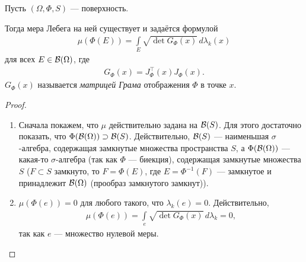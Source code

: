 \begin{thm}
 Пусть $(\Omega, \Phi, S)$  --- поверхность.

 Тогда мера Лебега на ней существует и задаётся формулой
 \begin{align*}
  \mu(\Phi(E)) = \int\limits_{E} \sqrt{ \det G_{\Phi}(x) } \, d\lambda_k(x)
 \end{align*} для всех $E \in \mathcal{B}(\Omega)$, где
 \begin{align}
  \label{equation:lebesgue_measure_on_surface_formula}
  G_{\Phi}(x) = J_{\Phi}^{\top}(x) J_{\Phi}(x)
 .\end{align}  $G_{\Phi}(x)$ называется \textit{матрицей Грама} отображения $\Phi$ в точке $x$.
\end{thm}
\begin{proof}\
 \begin{enumerate}
 \item Сначала покажем, что $\mu$ действительно задана на $\mathcal{B}(S)$. Для этого достаточно показать, что $\Phi(\mathcal{B}(\Omega)) \supset \mathcal{B}(S)$. Действительно, $\mathcal{B}(S)$ --- наименьшая $\sigma$-алгебра, содержащая замкнутые множества пространства $S$, а $\Phi(\mathcal{B}(\Omega))$ --- какая-то $\sigma$-алгебра (так как $\Phi$ --- биекция), содержащая замкнутые множества $S$ ($F \subset S$ замкнуто, то $F = \Phi(E)$, где $E = \Phi^{-1}(F)$ --- замкнутое и принадлежит $\mathcal{B}(\Omega)$ (прообраз замкнутого замкнут)).

 \item $\mu(\Phi(e)) = 0$ для любого такого, что  $\lambda_k(e) = 0$. Действительно,
   \begin{align*}
    \mu(\Phi(e)) = \int\limits_{e} \sqrt{\det G_{\Phi}(x)} \, d\lambda_k = 0
  ,\end{align*} так как $e$ --- множество нулевой меры.


\end{enumerate}
\end{proof}
